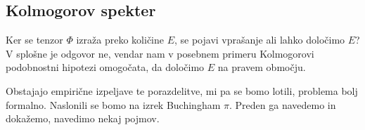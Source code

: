 \documentclass[mat2, tisk]{fmfdelo}
\begin{document}
\subsection{Kolmogorov spekter}

Ker se tenzor $\Phi$ izraža preko količine $E$, se pojavi vprašanje 
ali lahko določimo $E$? V splošne je odgovor ne, vendar nam v posebnem 
primeru Kolmogorovi podobnostni hipotezi omogočata, da določimo
$E$ na pravem območju.

Obstajajo empirične izpeljave te porazdelitve, mi pa se bomo lotili, 
problema bolj formalno. Naslonili se bomo na izrek Buchingham $\pi$.
Preden ga navedemo in dokažemo, navedimo nekaj pojmov. 






\end{document}
